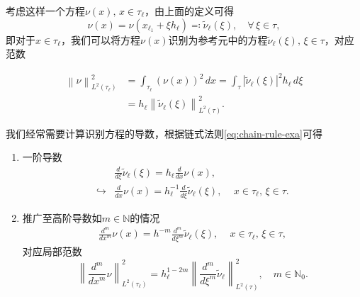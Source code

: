 考虑这样一个方程$\nu(x), \, x \in \tau_{\ell}$，由上面的定义可得
\begin{equation*}
  \nu(x) = \nu(x_{\ell_{1}} + \xi h_{\ell} ) \eqqcolon \widetilde{\nu}_{\ell}(\xi), \quad \forall \, \xi \in \tau,
\end{equation*}
即对于$x \in \tau_{\ell}$，我们可以将方程$\nu(x)$识别为参考元中的方程$\widetilde{\nu}_{\ell}(\xi), \, \xi \in \tau$，对应范数

\begin{equation*}
  \begin{split}
    \left\| \nu \right\|_{L^{2}(\tau_{\ell})}^2
    &= \int_{\tau_{\ell}} \left( \nu(x) \right)^{2} \, dx = \int_{\tau} \left| \widetilde{\nu}_{\ell}(\xi) \right|^{2} h_{\ell} \, d \xi \\
    & = h_{\ell} \left\| \widetilde{\nu}_{\ell}(\xi) \right\|_{L^{2}(\tau)}^{2}.
  \end{split}
\end{equation*}

我们经常需要计算识别方程的导数，根据链式法则\eqref{eq:chain-rule-exa}可得
\begin{enumerate}
  \item 一阶导数
  \begin{equation*}
    \begin{split}
      &\frac{d}{d \xi} \widetilde{\nu}_{\ell}(\xi) = h_{\ell} \frac{d}{d x} \nu(x), \\
      \hookrightarrow & \frac{d}{d x}\nu(x) =
      h_{\ell}^{-1} \frac{d}{d \xi} \widetilde{\nu}_{\ell}(\xi), \quad \, x \in \tau_{\ell}, \, \xi \in \tau.
    \end{split}
  \end{equation*}
  \item 推广至高阶导数如$m \in \mathbb{N}$的情况
  \begin{equation*}
    \begin{split}
      \frac{d^{m}}{d x^{m}} \nu(x) = h^{- m} \frac{d^{m}}{d \xi^{m}}
      \widetilde{\nu}_{\ell}(\xi), \quad \, x \in \tau_{\ell}, \, \xi \in \tau,
    \end{split}
  \end{equation*}
  对应局部范数
  \begin{equation}
    \label{eq:finele-ref-local-norm}
    \left\|
    \frac{d^{m}}{d x^{m}}  \nu
    \right\|_{L^{2}(\tau_{\ell})}^{2}
    = h_{\ell}^{1-2m}
    \left\|
    \frac{d^{m}}{d \xi^{m}} \widetilde{\nu}_{\ell}
    \right\|_{L^{2}(\tau)}^{2}, \quad m \in \mathbb{N}_{0}.
  \end{equation}
\end{enumerate}

